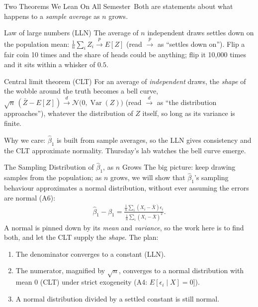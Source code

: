 \documentclass[aspectratio=169,11pt,xcolor=dvipsnames]{beamer}
\DeclareMathOperator{\Var}{Var}
\newcommand{\E}{E}
\newcommand{\dto}{\overset{d}{\longrightarrow}}
\newcommand{\pto}{\overset{p}{\longrightarrow}}
\newcommand{\core}{\,\raisebox{0.6pt}{\textcolor{corestar}{$\bigstar$}}}
\begin{document}
\begin{frame}{Two Theorems We Lean On All Semester\core}
Both are statements about what happens to a \emph{sample average} as $n$ grows.
\vskip2pt
\begin{block}{Law of large numbers (LLN)}
The average of $n$ independent draws settles down on the population mean:
$\frac1n\sum_i Z_i \pto \E[Z]$ (read $\pto$ as ``settles down on''). Flip a fair coin 10 times and the share of
heads could be anything; flip it 10{,}000 times and it sits within a whisker
of $0.5$.
\end{block}
\vskip2pt
\begin{block}{Central limit theorem (CLT)}
For an average of \emph{independent} draws, the \emph{shape} of the wobble
around the truth becomes a bell curve, $\sqrt n\,(\bar Z - \E[Z]) \dto
\mathcal N\big(0, \Var(Z)\big)$ (read $\dto$ as ``the distribution
approaches''), \alert{whatever the distribution of $Z$ itself}, so long as
its variance is finite.
\end{block}
\vskip2pt
Why we care: $\hat\beta_1$ is built from sample averages, so the LLN gives
consistency and the CLT approximate normality. Thursday's lab watches the
bell curve emerge.
\end{frame}

\begin{frame}{The Sampling Distribution of $\hat\beta_1$, as $n$ Grows}
The big picture: \alert{keep drawing samples from the population; as $n$
grows, we will show that $\hat\beta_1$'s sampling behaviour approximates a
normal distribution}, without ever assuming the errors are normal (A6):
\begin{align*}
  \hat\beta_1 - \beta_1 = \frac{\frac1n\sum_i (X_i-\bar X)\epsilon_i}
                               {\frac1n\sum_i (X_i-\bar X)^2} .
\end{align*}
A normal is pinned down by its \emph{mean} and \emph{variance}, so the work
here is to find both, and let the CLT supply the \emph{shape}.
\vskip2pt
The plan:
\begin{enumerate}\itemsep0pt
  \item The denominator converges to a constant (LLN).
  \item The numerator, magnified by $\sqrt n$, converges to a normal
        distribution with mean $0$ (CLT) under strict exogeneity (A4: $\E[\epsilon_i \mid X] = 0 ]$).
  \item A normal distribution divided by a settled constant is still normal.
\end{enumerate}
\end{frame}
\end{document}
